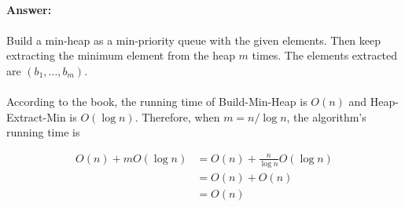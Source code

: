 \documentclass{article}
\begin{document}
\paragraph{Answer:}

\paragraph{}
Build a min-heap as a min-priority queue with the given elements. Then keep extracting the minimum element from the heap $m$ times. The elements extracted are $(b_1,\dots,b_m)$.

\paragraph{}
According to the book, the running time of Build-Min-Heap is $O(n)$ and Heap-Extract-Min is $O(\log n)$. Therefore, when $m=n/\log n$, the algorithm's running time is

$$\begin{aligned}
O(n)+mO(\log n)&=O(n)+\frac{n}{\log n}O(\log n)\\
&=O(n)+O(n)\\
&=O(n)
\end{aligned}$$
\end{document}
